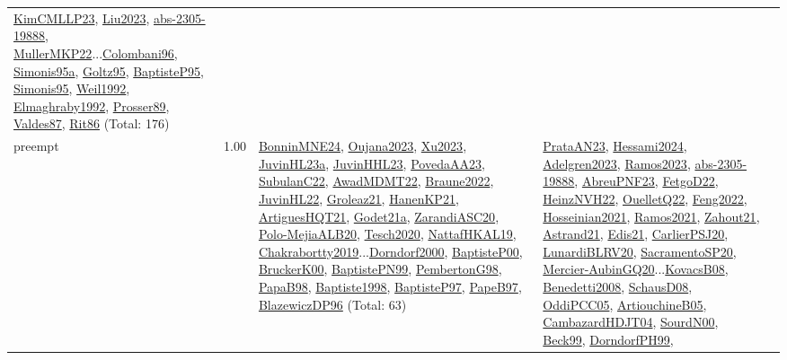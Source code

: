 {\begin{longtable}{p{3cm}r>{\raggedright\arraybackslash}p{6cm}>{\raggedright\arraybackslash}p{6cm}>{\raggedright\arraybackslash}p{8cm}}
\hyperref[detail:KimCMLLP23]{KimCMLLP23}, \hyperref[detail:Liu2023]{Liu2023}, \hyperref[detail:abs-2305-19888]{abs-2305-19888}, \hyperref[detail:MullerMKP22]{MullerMKP22}...\hyperref[detail:Colombani96]{Colombani96}, \hyperref[detail:Simonis95a]{Simonis95a}, \hyperref[detail:Goltz95]{Goltz95}, \hyperref[detail:BaptisteP95]{BaptisteP95}, \hyperref[detail:Simonis95]{Simonis95}, \hyperref[detail:Weil1992]{Weil1992}, \hyperref[detail:Elmaghraby1992]{Elmaghraby1992}, \hyperref[detail:Prosser89]{Prosser89}, \hyperref[detail:Valdes87]{Valdes87}, \hyperref[detail:Rit86]{Rit86} (Total: 176)\\
\index{preempt}\index{Concepts!preempt}preempt &  1.00 & \hyperref[detail:BonninMNE24]{BonninMNE24}, \hyperref[detail:Oujana2023]{Oujana2023}, \hyperref[detail:Xu2023]{Xu2023}, \hyperref[detail:JuvinHL23a]{JuvinHL23a}, \hyperref[detail:JuvinHHL23]{JuvinHHL23}, \hyperref[detail:PovedaAA23]{PovedaAA23}, \hyperref[detail:SubulanC22]{SubulanC22}, \hyperref[detail:AwadMDMT22]{AwadMDMT22}, \hyperref[detail:Braune2022]{Braune2022}, \hyperref[detail:JuvinHL22]{JuvinHL22}, \hyperref[detail:Groleaz21]{Groleaz21}, \hyperref[detail:HanenKP21]{HanenKP21}, \hyperref[detail:ArtiguesHQT21]{ArtiguesHQT21}, \hyperref[detail:Godet21a]{Godet21a}, \hyperref[detail:ZarandiASC20]{ZarandiASC20}, \hyperref[detail:Polo-MejiaALB20]{Polo-MejiaALB20}, \hyperref[detail:Tesch2020]{Tesch2020}, \hyperref[detail:NattafHKAL19]{NattafHKAL19}, \hyperref[detail:Chakrabortty2019]{Chakrabortty2019}...\hyperref[detail:Dorndorf2000]{Dorndorf2000}, \hyperref[detail:BaptisteP00]{BaptisteP00}, \hyperref[detail:BruckerK00]{BruckerK00}, \hyperref[detail:BaptistePN99]{BaptistePN99}, \hyperref[detail:PembertonG98]{PembertonG98}, \hyperref[detail:PapaB98]{PapaB98}, \hyperref[detail:Baptiste1998]{Baptiste1998}, \hyperref[detail:BaptisteP97]{BaptisteP97}, \hyperref[detail:PapeB97]{PapeB97}, \hyperref[detail:BlazewiczDP96]{BlazewiczDP96} (Total: 63) & \hyperref[detail:PrataAN23]{PrataAN23}, \hyperref[detail:Hessami2024]{Hessami2024}, \hyperref[detail:Adelgren2023]{Adelgren2023}, \hyperref[detail:Ramos2023]{Ramos2023}, \hyperref[detail:abs-2305-19888]{abs-2305-19888}, \hyperref[detail:AbreuPNF23]{AbreuPNF23}, \hyperref[detail:FetgoD22]{FetgoD22}, \hyperref[detail:HeinzNVH22]{HeinzNVH22}, \hyperref[detail:OuelletQ22]{OuelletQ22}, \hyperref[detail:Feng2022]{Feng2022}, \hyperref[detail:Hosseinian2021]{Hosseinian2021}, \hyperref[detail:Ramos2021]{Ramos2021}, \hyperref[detail:Zahout21]{Zahout21}, \hyperref[detail:Astrand21]{Astrand21}, \hyperref[detail:Edis21]{Edis21}, \hyperref[detail:CarlierPSJ20]{CarlierPSJ20}, \hyperref[detail:LunardiBLRV20]{LunardiBLRV20}, \hyperref[detail:SacramentoSP20]{SacramentoSP20}, \hyperref[detail:Mercier-AubinGQ20]{Mercier-AubinGQ20}...\hyperref[detail:KovacsB08]{KovacsB08}, \hyperref[detail:Benedetti2008]{Benedetti2008}, \hyperref[detail:SchausD08]{SchausD08}, \hyperref[detail:OddiPCC05]{OddiPCC05}, \hyperref[detail:ArtiouchineB05]{ArtiouchineB05}, \hyperref[detail:CambazardHDJT04]{CambazardHDJT04}, \hyperref[detail:SourdN00]{SourdN00}, \hyperref[detail:Beck99]{Beck99}, \hyperref[detail:DorndorfPH99]{DorndorfPH99}, 
\end{longtable}}
